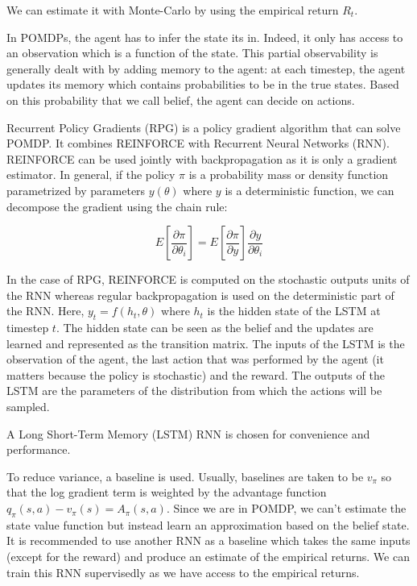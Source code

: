 \documentclass{article} %
\begin{document}
We can estimate it with Monte-Carlo by using the empirical return $R_t$.


In POMDPs, the agent has to infer the state its in. Indeed, it only has access to an observation which is a function of the state. This partial observability is generally dealt with by adding memory to the agent: at each timestep, the agent updates its memory which contains probabilities to be in the true states. Based on this probability that we call belief, the agent can decide on actions. 

Recurrent Policy Gradients\cite{wierstra2010recurrent} (RPG) is a policy gradient algorithm that can solve POMDP. It combines REINFORCE with Recurrent Neural Networks (RNN). REINFORCE can be used jointly with backpropagation as it is only a gradient estimator\cite{williams1992simple}. In general, if the policy $\pi$ is a probability mass or density function parametrized by parameters $y(\theta)$ where $y$ is a deterministic function, we can decompose the gradient using the chain rule:

$$ E[\frac{\partial \pi}{\partial \theta_i}] = E[\frac{\partial \pi}{\partial y}] \frac{\partial y}{\partial \theta_{i}} $$

In the case of RPG, REINFORCE is computed on the stochastic outputs units of the RNN whereas regular backpropagation is used on the deterministic part of the RNN. Here, $y_t = f(h_t, \theta)$ where $h_t$ is the hidden state of the LSTM at timestep $t$. The hidden state can be seen as the belief and the updates are learned and represented as the transition matrix. The inputs of the LSTM is the observation of the agent, the last action that was performed by the agent (it matters because the policy is stochastic) and the reward. The outputs of the LSTM are the parameters of the distribution from which the actions will be sampled.

A Long Short-Term Memory\cite{hochreiter1997long} (LSTM) RNN is chosen for convenience and performance. 

To reduce variance, a baseline is used. Usually, baselines are taken to be $v_{\pi}$ so that the log gradient term is weighted by the advantage function $q_{\pi}(s,a) - v_{\pi}(s) = A_{\pi}(s,a)$. Since we are in POMDP, we can't estimate the state value function but instead learn an approximation based on the belief state. It is recommended to use another RNN as a baseline which takes the same inputs (except for the reward) and produce an estimate of the empirical returns. We can train this RNN supervisedly as we have access to the empirical returns.
\end{document}
